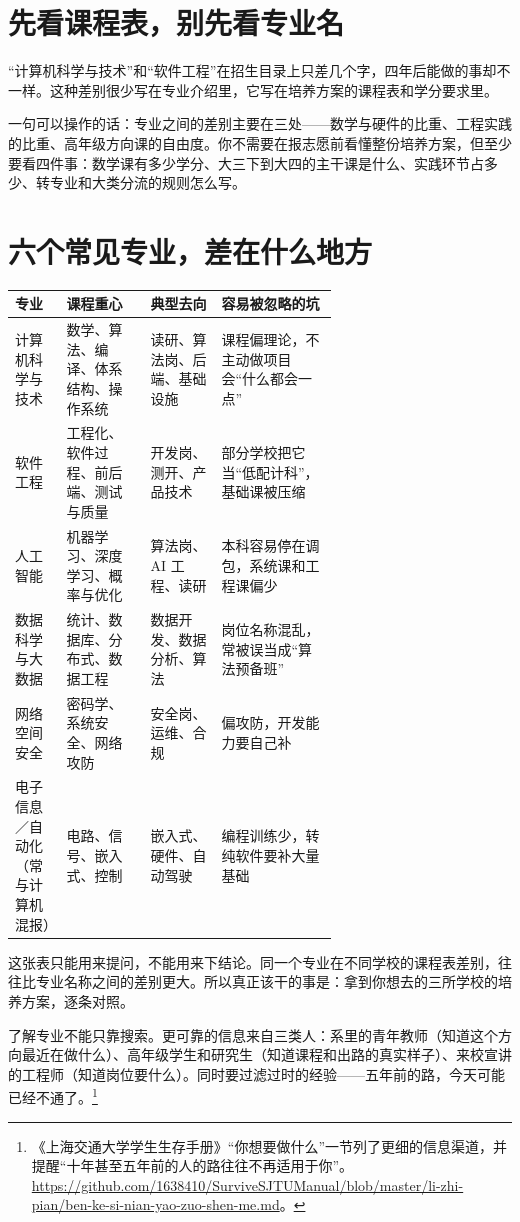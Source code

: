 \documentclass[UTF8,zihao=5,openany]{ctexbook}
\begin{document}
\section{先看课程表，别先看专业名}
“计算机科学与技术”和“软件工程”在招生目录上只差几个字，四年后能做的事却不一样。这种差别很少写在专业介绍里，它写在培养方案的课程表和学分要求里。

一句可以操作的话：专业之间的差别主要在三处——数学与硬件的比重、工程实践的比重、高年级方向课的自由度。你不需要在报志愿前看懂整份培养方案，但至少要看四件事：数学课有多少学分、大三下到大四的主干课是什么、实践环节占多少、转专业和大类分流的规则怎么写。

\section{六个常见专业，差在什么地方}
\begin{center}\footnotesize
\begin{tabularx}{\linewidth}{p{0.16\linewidth}p{0.26\linewidth}p{0.22\linewidth}Y}
\toprule
专业 & 课程重心 & 典型去向 & 容易被忽略的坑 \\
\midrule
计算机科学与技术 & 数学、算法、编译、体系结构、操作系统 & 读研、算法岗、后端、基础设施 & 课程偏理论，不主动做项目会“什么都会一点” \\
软件工程 & 工程化、软件过程、前后端、测试与质量 & 开发岗、测开、产品技术 & 部分学校把它当“低配计科”，基础课被压缩 \\
人工智能 & 机器学习、深度学习、概率与优化 & 算法岗、AI 工程、读研 & 本科容易停在调包，系统课和工程课偏少 \\
数据科学与大数据 & 统计、数据库、分布式、数据工程 & 数据开发、数据分析、算法 & 岗位名称混乱，常被误当成“算法预备班” \\
网络空间安全 & 密码学、系统安全、网络攻防 & 安全岗、运维、合规 & 偏攻防，开发能力要自己补 \\
电子信息／自动化（常与计算机混报） & 电路、信号、嵌入式、控制 & 嵌入式、硬件、自动驾驶 & 编程训练少，转纯软件要补大量基础 \\
\bottomrule
\end{tabularx}
\end{center}

这张表只能用来提问，不能用来下结论。同一个专业在不同学校的课程表差别，往往比专业名称之间的差别更大。所以真正该干的事是：拿到你想去的三所学校的培养方案，逐条对照。

了解专业不能只靠搜索。更可靠的信息来自三类人：系里的青年教师（知道这个方向最近在做什么）、高年级学生和研究生（知道课程和出路的真实样子）、来校宣讲的工程师（知道岗位要什么）。同时要过滤过时的经验——五年前的路，今天可能已经不通了。\footnote{《上海交通大学学生生存手册》“你想要做什么”一节列了更细的信息渠道，并提醒“十年甚至五年前的人的路往往不再适用于你”。\url{https://github.com/1638410/SurviveSJTUManual/blob/master/li-zhi-pian/ben-ke-si-nian-yao-zuo-shen-me.md}。}
\end{document}
